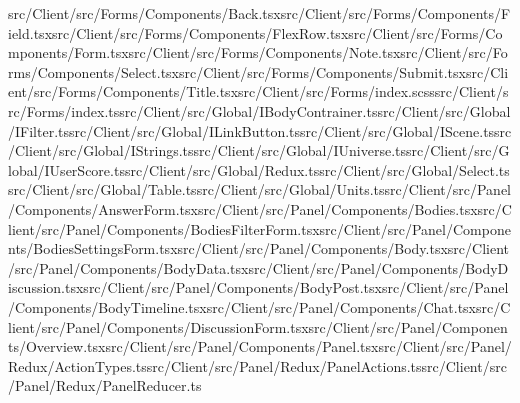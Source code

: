\documentclass[a4paper,12pt]{article}
\begin{document}
src/Client/src/Forms/Components/Back.tsx\newline src/Client/src/Forms/Components/Field.tsx\newline src/Client/src/Forms/Components/FlexRow.tsx\newline src/Client/src/Forms/Components/Form.tsx\newline src/Client/src/Forms/Components/Note.tsx\newline src/Client/src/Forms/Components/Select.tsx\newline src/Client/src/Forms/Components/Submit.tsx\newline src/Client/src/Forms/Components/Title.tsx\newline src/Client/src/Forms/index.scss\newline src/Client/src/Forms/index.ts\newline src/Client/src/Global/IBodyContrainer.ts\newline src/Client/src/Global/IFilter.ts\newline src/Client/src/Global/ILinkButton.ts\newline src/Client/src/Global/IScene.ts\newline src/Client/src/Global/IStrings.ts\newline src/Client/src/Global/IUniverse.ts\newline src/Client/src/Global/IUserScore.ts\newline src/Client/src/Global/Redux.ts\newline src/Client/src/Global/Select.ts\newline src/Client/src/Global/Table.ts\newline src/Client/src/Global/Units.ts\newline src/Client/src/Panel/Components/AnswerForm.tsx\newline src/Client/src/Panel/Components/Bodies.tsx\newline src/Client/src/Panel/Components/BodiesFilterForm.tsx\newline src/Client/src/Panel/Components/BodiesSettingsForm.tsx\newline src/Client/src/Panel/Components/Body.tsx\newline src/Client/src/Panel/Components/BodyData.tsx\newline src/Client/src/Panel/Components/BodyDiscussion.tsx\newline src/Client/src/Panel/Components/BodyPost.tsx\newline src/Client/src/Panel/Components/BodyTimeline.tsx\newline src/Client/src/Panel/Components/Chat.tsx\newline src/Client/src/Panel/Components/DiscussionForm.tsx\newline src/Client/src/Panel/Components/Overview.tsx\newline src/Client/src/Panel/Components/Panel.tsx\newline src/Client/src/Panel/Redux/ActionTypes.ts\newline src/Client/src/Panel/Redux/PanelActions.ts\newline src/Client/src/Panel/Redux/PanelReducer.ts\newline 
\end{document}
